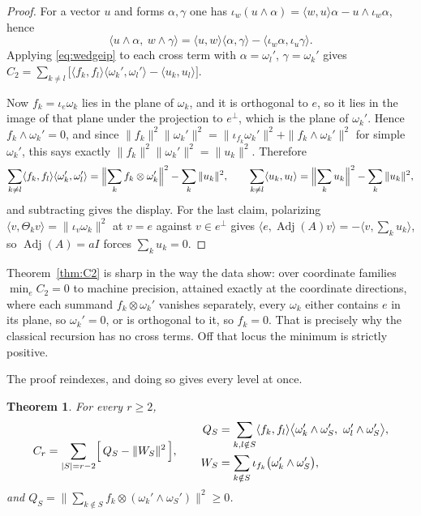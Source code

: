 \documentclass[11pt]{article}
\newtheorem{theorem}{Theorem}
\theoremstyle{remark}
\begin{document}
\begin{proof}
For a vector $u$ and forms $\alpha,\gamma$ one has
$\iota_w(u\wedge\alpha)=\langle w,u\rangle\alpha-u\wedge\iota_w\alpha$, hence
\begin{equation}\label{eq:wedgeip}
\langle u\wedge\alpha,\ w\wedge\gamma\rangle
=\langle u,w\rangle\langle\alpha,\gamma\rangle-\langle\iota_w\alpha,\iota_u\gamma\rangle .
\end{equation}
Applying \eqref{eq:wedgeip} to each cross term with $\alpha=\omega_l'$,
$\gamma=\omega_k'$ gives
$C_2=\sum_{k\ne l}\bigl[\langle f_k,f_l\rangle\langle\omega_k',\omega_l'\rangle
-\langle u_k,u_l\rangle\bigr]$.

Now $f_k=\iota_e\omega_k$ lies in the plane of $\omega_k$, and it is orthogonal to $e$,
so it lies in the image of that plane under the projection to $e^\perp$, which is the
plane of $\omega_k'$. Hence $f_k\wedge\omega_k'=0$, and since
$\|f_k\|^2\|\omega_k'\|^2=\|\iota_{f_k}\omega_k'\|^2+\|f_k\wedge\omega_k'\|^2$ for simple
$\omega_k'$, this says exactly
$\|f_k\|^2\|\omega_k'\|^2=\|u_k\|^2$. Therefore
\[
\sum_{k\ne l}\langle f_k,f_l\rangle\langle\omega_k',\omega_l'\rangle
=\Bigl\|\sum_kf_k\otimes\omega_k'\Bigr\|^2-\sum_k\|u_k\|^2,
\qquad
\sum_{k\ne l}\langle u_k,u_l\rangle=\Bigl\|\sum_ku_k\Bigr\|^2-\sum_k\|u_k\|^2,
\]
and subtracting gives the display. For the last claim, polarizing
$\langle v,\Theta_kv\rangle=\|\iota_v\omega_k\|^2$ at $v=e$ against $v\in e^\perp$ gives
$\langle e,\operatorname{Adj}(A)v\rangle=-\langle v,\sum_k u_k\rangle$, so
$\operatorname{Adj}(A)=aI$ forces $\sum_ku_k=0$.
\end{proof}

Theorem~\ref{thm:C2} is sharp in the way the data show: over coordinate families
$\min_eC_2=0$ to machine precision, attained exactly at the coordinate directions, where
each summand $f_k\otimes\omega_k'$ vanishes separately, every $\omega_k$ either
contains $e$ in its plane, so $\omega_k'=0$, or is orthogonal to it, so $f_k=0$. That is
precisely why the classical recursion has no cross terms. Off that locus the minimum is
strictly positive.

The proof reindexes, and doing so gives every level at once.

\begin{theorem}\label{thm:Cr}
For every $r\ge2$,
\[
C_r=\sum_{|S|=r-2}\Bigl[\,Q_S-\|W_S\|^2\,\Bigr],
\qquad
\begin{aligned}
Q_S&=\sum_{k,l\notin S}\langle f_k,f_l\rangle
\bigl\langle\omega_k'\wedge\omega_S',\ \omega_l'\wedge\omega_S'\bigr\rangle,\\
W_S&=\sum_{k\notin S}\iota_{f_k}\bigl(\omega_k'\wedge\omega_S'\bigr),
\end{aligned}
\]
and $Q_S=\bigl\|\sum_{k\notin S}f_k\otimes(\omega_k'\wedge\omega_S')\bigr\|^2\ge0$.
\end{theorem}
\end{document}
